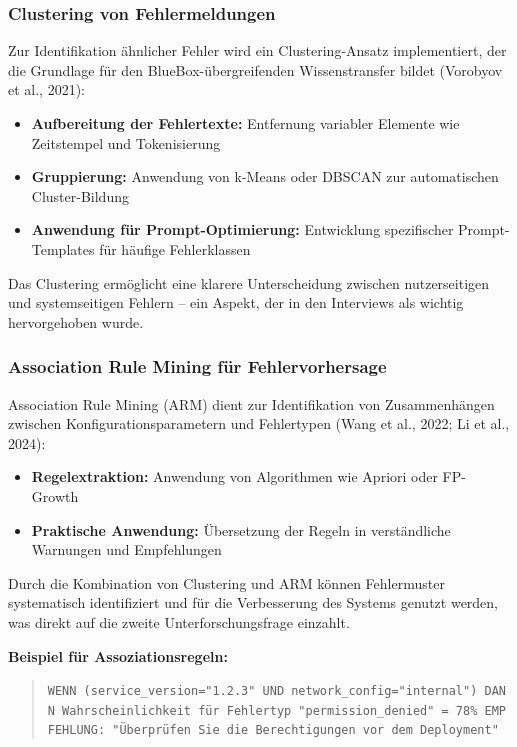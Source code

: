 \documentclass[
  a4paper,
  12pt,
  oneside,
  open=any,
  BCOR=12mm,
  DIV=14,
  parskip=half*,
  headsepline,
  footsepline,
  pointlessnumbers,
  liststotoc,
  numbers=noenddot,
  listof=totoc]{scrartcl}
\begin{document}
\subsubsection{Clustering von
Fehlermeldungen}\label{clustering-von-fehlermeldungen}

Zur Identifikation ähnlicher Fehler wird ein Clustering-Ansatz
implementiert, der die Grundlage für den BlueBox-übergreifenden
Wissenstransfer bildet (Vorobyov et al., 2021):

\begin{itemize}
\item
  \textbf{Aufbereitung der Fehlertexte:} Entfernung variabler Elemente
  wie Zeitstempel und Tokenisierung
\item
  \textbf{Gruppierung:} Anwendung von k-Means oder DBSCAN zur
  automatischen Cluster-Bildung
\item
  \textbf{Anwendung für Prompt-Optimierung:} Entwicklung spezifischer
  Prompt-Templates für häufige Fehlerklassen
\end{itemize}

Das Clustering ermöglicht eine klarere Unterscheidung zwischen
nutzerseitigen und systemseitigen Fehlern -- ein Aspekt, der in den
Interviews als wichtig hervorgehoben wurde.

\subsubsection{Association Rule Mining für
Fehlervorhersage}\label{association-rule-mining-fuxfcr-fehlervorhersage}

Association Rule Mining (ARM) dient zur Identifikation von
Zusammenhängen zwischen Konfigurationsparametern und Fehlertypen (Wang
et al., 2022; Li et al., 2024):

\begin{itemize}
\item
  \textbf{Regelextraktion:} Anwendung von Algorithmen wie Apriori oder
  FP-Growth
\item
  \textbf{Praktische Anwendung:} Übersetzung der Regeln in verständliche
  Warnungen und Empfehlungen
\end{itemize}

Durch die Kombination von Clustering und ARM können Fehlermuster
systematisch identifiziert und für die Verbesserung des Systems genutzt
werden, was direkt auf die zweite Unterforschungsfrage einzahlt.

\textbf{Beispiel für Assoziationsregeln:}

\begin{quote}
\texttt{WENN\ (service\_version="1.2.3"\ UND\ network\_config="internal")\ DANN\ Wahrscheinlichkeit\ für\ Fehlertyp\ "permission\_denied"\ =\ 78\%\ EMPFEHLUNG:\ "Überprüfen\ Sie\ die\ Berechtigungen\ vor\ dem\ Deployment"}
\end{quote}
\end{document}
